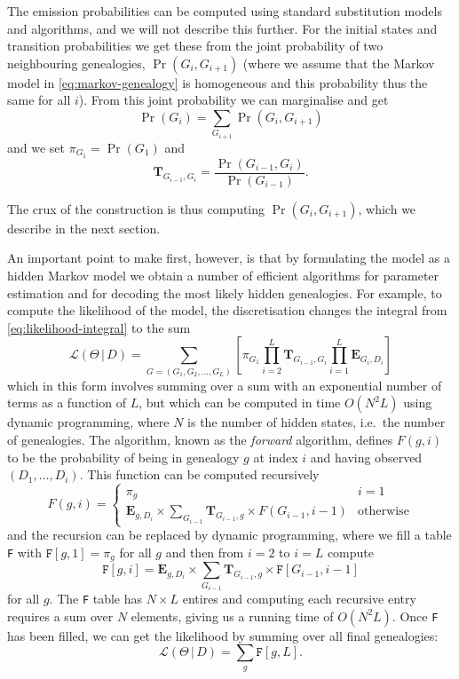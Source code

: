 \documentclass[graybox]{svmult}
\newcommand{\G}{\ensuremath{G}}
\renewcommand{\D}{\ensuremath{D}}
\renewcommand{\lhd}{\ensuremath{\mathcal{L}}}
\newcommand{\T}{\ensuremath{\mathbf{T}}}
\renewcommand{\E}{\ensuremath{\mathbf{E}}}
\begin{document}
The emission probabilities can be computed using standard substitution models and algorithms, and we will not describe this further. For the initial states and transition probabilities we get these from the joint probability of two neighbouring genealogies, $\Pr(\G_i,\G_{i+1})$ (where we assume that the Markov model in \eqref{eq:markov-genealogy} is homogeneous and this probability thus the same for all $i$). From this joint probability we can marginalise and get
\begin{equation} \label{eq:pi-from-joint-prob}
  \Pr(\G_i) = \sum_{\G_{i+1}} \Pr(\G_i,\G_{i+1})
\end{equation}
and we set $\pi_{\G_1}=\Pr(\G_1)$ and 
\begin{equation} \label{eq:transitions-from-joint-prob}
  \T_{\G_{i-1},\G_i} = \frac{\Pr(\G_{i-1},\G_i)}{\Pr(\G_{i-1})}.
\end{equation}

The crux of the construction is thus computing $\Pr(\G_i,\G_{i+1})$, which we describe in the next section.

An important point to make first, however, is that by formulating the model as a hidden Markov model we obtain a number of efficient algorithms for parameter estimation and for decoding the most likely hidden genealogies. For example, to compute the likelihood of the model, the discretisation changes the integral from \eqref{eq:likelihood-integral} to the sum
\begin{equation}
  \label{eq:likelhood-sum}
  \lhd(\Theta\,|\,\D) = 
  \sum_{\G=(\G_1,\G_2,\ldots,\G_L)} 
  	\left[
   	  \pi_{\G_1}
  	  \prod_{i=2}^{L}\T_{\G_{i-1},\G_{i}}
  	  \prod_{i=1}^L  \E_{\G_i,\D_i}
  	\right]
\end{equation}
which in this form involves summing over a sum with an exponential number of terms as a function of $L$, but which can be computed in time $O(N^2L)$ using dynamic programming, where $N$ is the number of hidden states, i.e.\ the number of genealogies. The algorithm, known as the \emph{forward} algorithm, defines $F(g,i)$ to be the probability of being in genealogy $g$ at index $i$ and having observed $(\D_1,\ldots,\D_i)$. This function can be computed recursively
\begin{equation}
  F(g,i) = 
  \begin{cases}
  	\pi_g & i = 1 \\
  	\E_{g,\D_i} \times \sum_{\G_{i-1}}\T_{\G_{i-1},g} \times F(\G_{i-1},i-1)
  	& \mathrm{otherwise}
  \end{cases}
\end{equation}
and the recursion can be replaced by dynamic programming, where we fill a table \texttt{F} with $\mathtt{F}[g,1] = \pi_g$ for all $g$ and then from $i=2$ to $i=L$ compute
\[
\mathtt{F}[g,i] = \E_{g,\D_i} \times \sum_{\G_{i-1}}\T_{\G_{i-1},g} \times \mathtt{F}[\G_{i-1},i-1]
\]
for all $g$. The \texttt{F} table has $N\times L$ entires and computing each recursive entry requires a sum over $N$ elements, giving us a running time of $O(N^2L)$. Once \texttt{F} has been filled, we can get the likelihood by summing over all final genealogies:
\begin{equation}
  \lhd(\Theta\,|\,\D) = \sum_{g} \mathtt{F}[g,L].
\end{equation}
\end{document}
